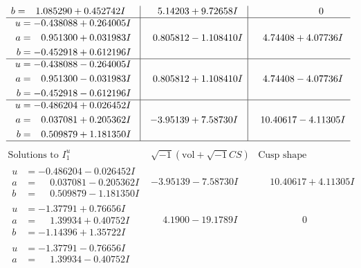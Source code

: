 \documentclass[1p]{elsarticle_modified}
\theoremstyle{definition}
\newcommand{\I}{\sqrt{-1}}
\begin{document}
$$\begin{array}{c|c|c}
\begin{aligned}
b &= \phantom{-}1.085290 + 0.452742 I\end{aligned}
 & \phantom{-}5.14203 + 9.72658 I & \phantom{-0.000000 } 0 \\ \hline\begin{aligned}
u &= -0.438088 + 0.264005 I \\
a &= \phantom{-}0.951300 + 0.031983 I \\
b &= -0.452918 + 0.612196 I\end{aligned}
 & \phantom{-}0.805812 - 1.108410 I & \phantom{-}4.74408 + 4.07736 I \\ \hline\begin{aligned}
u &= -0.438088 - 0.264005 I \\
a &= \phantom{-}0.951300 - 0.031983 I \\
b &= -0.452918 - 0.612196 I\end{aligned}
 & \phantom{-}0.805812 + 1.108410 I & \phantom{-}4.74408 - 4.07736 I \\ \hline\begin{aligned}
u &= -0.486204 + 0.026452 I \\
a &= \phantom{-}0.037081 + 0.205362 I \\
b &= \phantom{-}0.509879 + 1.181350 I\end{aligned}
 & -3.95139 + 7.58730 I & \phantom{-}10.40617 - 4.11305 I\\
 \hline 
 \end{array}$$\newpage$$\begin{array}{c|c|c}  
\text{Solutions to }I^u_{1}& \I (\text{vol} + \sqrt{-1}CS) & \text{Cusp shape}\\
 \hline 
\begin{aligned}
u &= -0.486204 - 0.026452 I \\
a &= \phantom{-}0.037081 - 0.205362 I \\
b &= \phantom{-}0.509879 - 1.181350 I\end{aligned}
 & -3.95139 - 7.58730 I & \phantom{-}10.40617 + 4.11305 I \\ \hline\begin{aligned}
u &= -1.37791 + 0.76656 I \\
a &= \phantom{-}1.39934 + 0.40752 I \\
b &= -1.14396 + 1.35722 I\end{aligned}
 & \phantom{-}4.1900 - 19.1789 I & \phantom{-0.000000 } 0 \\ \hline\begin{aligned}
u &= -1.37791 - 0.76656 I \\
a &= \phantom{-}1.39934 - 0.40752 I \\

\end{aligned}
\end{array}$$
\end{document}
